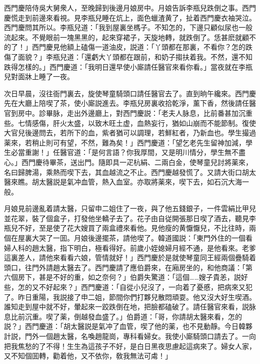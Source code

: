 西門慶陪侍吳大舅衆人，至晚歸到後邊月娘房中。月娘告訴李瓶兒跌倒之事。西門慶慌走到前邊來看視。見李瓶兒睡在炕上，面色蠟渣黄了，扯着西門慶衣袖哭泣。西門慶問其所以。李瓶兒道：「我到屋裏坐榪子。不知怎的，下邊只顧似尿也一般流起來。不覺眼前一塊黑黑的，起來穿裙子，天旋地轉，就跌倒了。恁甚麽就顧不的了！」西門慶見他額上磕傷一道油皮，説道：「丫頭都在那裏，不看你？怎的跌傷了面貌？」李瓶兒道：「還虧大丫頭都在跟前，和奶子搊扶着我。不然，還不知跌得怎樣的。」西門慶道：「我明日還早使小廝請任醫官來看你看。」當夜就在李瓶兒對面牀上睡了一夜。

次日早晨，沒往衙門裏去，旋使琴童騎頭口請任醫官去了。直到晌午纔來。西門慶先在大廳上陪喫了茶，使小廝説進去。李瓶兒房裏收拾乾淨，薰下香，然後請任醫官到房中。診畢脉，走出外邊廳上，對西門慶説：「老夫人脉息，比前番甚加沉重些。七情感傷，肝火太盛，以致木旺土虚，血熱妄行，猶如山崩而不能節制。復使大官兒後邊問去，若所下的血，紫者猶可以調理，若鮮紅者，乃新血也。學生撮過薬來，若稍止則可有望，不然，難為矣！」西門慶道：「望乞老先生留神加減，學生必當重謝！」任醫官道：「是何言語？你我厚間，又是明川情分，學生無不盡心。」西門慶待畢茶，送出門。隨即具一疋杭絹、二兩白金，使琴童兒討將薬來，名曰歸脾湯，乘熱而喫下去，其血越流之不止。西門慶越發慌了。又請大街口胡太醫來瞧。胡太醫説是氣冲血管，熱入血室。亦取將薬來，喫下去，如石沉大海一般。

月娘見前邊亂着請太醫，只留申二姐住了一夜，與了他五錢銀子，一件雲絹比甲兒並花翠，裝了個盒子，打發他坐轎子去了。花子由自従開張那日喫了酒去，聽見李瓶兒不好，至是使了花大嫂買了兩盒禮來看他。見他瘦的黄懨懨兒，不比往時，兩個在屋裏大哭了一囬。月娘後邊擺茶，請他喫了。韓道國説：「東門外住的一個看婦人科的趙太醫，指下明白，極看得好。前歲小姪媳婦月經不通，是他看來。老爹這裏差人，請他來看看六娘，管情就好！」西門慶於是就使琴童同王經兩個疊騎着頭口，往門外請趙太醫去了。西門慶請了應伯爵來，在廂房坐的，和他商議：「第六個房下，甚是不好的重，如之奈何？」伯爵失驚道：「這個……嫂子貴恙，説好些，怎的又不好起來？」西門慶道：「自從小兒沒了，一向着了憂慼，把病來又犯了。昨日重陽，我説接了申二姐，節間你們打夥兒散悶頑耍。他又沒大好生喫酒。誰知走到屋中就不好，暈起來一跤跌倒在地，把臉都磕破了。請任醫官來看，説脉息比前沉重。喫了薬，倒越發血盛了。」伯爵道：「哥，你請胡太醫來看，怎的説？」西門慶道：「胡太醫説是氣冲了血管，喫了他的薬，也不見動靜。今日韓夥計説，門外一個趙太醫，名喚趙龍崗，專科看婦女。我使小廝騎頭口請去了。一向把我焦愁的了不得！生生為這孩子不好，是白日黑夜思慮起這病來了。婦女人家，又不知個囬轉，勸着他，又不依你，敎我無法可䖏！」

